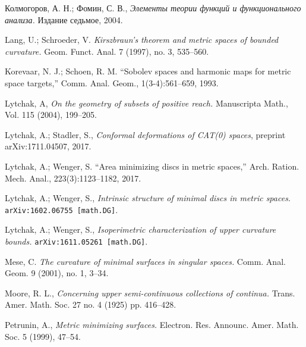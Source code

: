 \documentclass{article}
\begin{document}
\begin{thebibliography}{52}

\begin{otherlanguage}{russian}
Колмогоров, А. Н.;
Фомин, С. В.,
\textit{Элементы теории функций и функционального анализа.}
Издание седьмое, 2004.
\end{otherlanguage}





 Lang, U.; Schroeder, V.
\textit{Kirszbraun's theorem and metric spaces of bounded curvature.}
Geom. Funct. Anal. 7 (1997), no. 3, 535--560. 

Korevaar, N. J.; Schoen, R. M. ``Sobolev spaces and harmonic maps for metric space targets,'' Comm. Anal. Geom., 1(3-4):561--659, 1993.

 Lytchak, A, 
\textit{On the geometry of subsets of positive reach.} 
Manuscripta Math., Vol. 115 (2004), 199--205. 


 Lytchak, A.; Stadler, S.,  \textit{Conformal deformations of CAT(0) spaces}, preprint arXiv:1711.04507, 2017.


Lytchak, A.; Wenger, S. ``Area minimizing discs in metric spaces,'' Arch. Ration. Mech. Anal., 223(3):1123--1182, 2017.


Lytchak, A.; Wenger, S.,
\textit{Intrinsic structure of minimal discs in metric spaces.} 
\texttt{arXiv:1602.06755 [math.DG]}.


 Lytchak, A.; Wenger, S.,  
\textit{Isoperimetric  characterization  of  upper  curvature bounds.}
\texttt{arXiv:1611.05261 [math.DG]}.

 Mese, C.
\textit{The curvature of minimal surfaces in singular spaces.}
Comm. Anal. Geom. 9 (2001), no. 1, 3--34. 

Moore, R. L.,
\textit{Concerning upper semi-continuous collections of continua.}
Trans. Amer. Math. Soc. 27 no. 4 (1925) pp. 416--428.

 Petrunin, A.,
\textit{Metric minimizing surfaces.}
Electron. Res. Announc. Amer. Math. Soc. 5 (1999), 47--54. 


\end{thebibliography}
\end{document}
